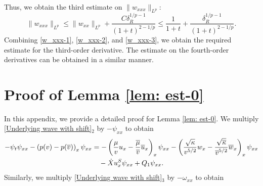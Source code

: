 \documentclass[11pt,reqno]{amsart}
\begin{document}
\begin{appendix}
\begin{align*}
\end{align*}
Thus, we obtain the third estimate on $\|w_{xxx}\|_{L^p}$:
\begin{equation}\label{w_xxx-3}
\|w_{xxx}\|_{L^p}\le \|w_{xx}\|_{L^p}+\frac{C\delta_R^{1/p-1}}{(1+t)^{2-1/p}}\le \frac{1}{1+t}+\frac{\delta_R^{1/p-1}}{(1+t)^{2-1/p}}.
\end{equation}
Combining \eqref{w_xxx-1}, \eqref{w_xxx-2}, and \eqref{w_xxx-3}, we obtain the required estimate for the third-order derivative. The estimate on the fourth-order derivatives can be obtained in a similar manner.

\section{Proof of Lemma \ref{lem: est-0}}\label{app:proof_high_order_1}
\setcounter{equation}{0}
In this appendix, we provide a detailed proof for Lemma \ref{lem: est-0}. We multiply \eqref{Underlying wave with shift}$_2$  by $-\psi_{xx}$ to obtain
\begin{equation}\label{eq: psi_t psi_xx}
\begin{aligned}
-\psi_t \psi_{xx} - \left(p(v)-p(\overline{v}) \right)_x \psi_{xx} &= -\left( \frac{\mu}{v} u_x- \frac{\overline{\mu}}{\overline{v}} \overline{u}_x \right)_x \psi_{xx} - \left( \frac{\sqrt{\kappa}}{v^{5/2}} w_x - \frac{\sqrt{\overline{\kappa}}}{\overline{v}^{5/2}} \overline{w}_x\right)_x \psi_{xx} \\
&\quad - \dot{X} u^S_x \psi_{xx} + Q_1 \psi_{xx}.
\end{aligned}
\end{equation}
Similarly, we multiply \eqref{Underlying wave with shift}$_3$ by  $-\omega_{xx}$ to obtain


\end{appendix}
\end{document}
